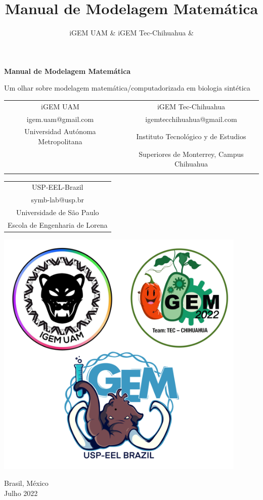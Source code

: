 \documentclass[11pt, letterpaper, portuguese]{article}
\title{Manual de Modelagem Matemática}
\author{iGEM UAM \&  iGEM Tec-Chihuahua \& }
\begin{document}
\begin{titlepage}
   \begin{center}
       \vspace*{1cm}

   {\Huge \textbf{Manual de Modelagem Matemática}}

       \vspace{0.5cm}
        Um olhar sobre modelagem matemática/computadorizada em biologia sintética
            
       \vspace{1.5 cm}

\centering\begin{tabular}{>{\centering\arraybackslash} c c c}
iGEM UAM &  & iGEM Tec-Chihuahua \\
igem.uam@gmail.com &  & igemtecchihuahua@gmail.com\\
Universidad Autónoma Metropolitana &  & Instituto Tecnológico y de Estudios\\
 &  & Superiores de Monterrey, Campus Chihuahua\\
 &  & \\
 \end{tabular}
 \centering\begin{tabular}{>{\centering\arraybackslash} c}
 USP-EEL-Brazil \\
symb-lab@usp.br \\
Universidade de São Paulo \\
Escola de Engenharia de Lorena \\
\end{tabular}



  \vspace{1.0cm}
        
\includegraphics[width=12cm]{Logos-Chih-UAM-USP.png}

       \vfill
       \vspace{0.8cm}
       Brasil, México\\
       Julho 2022
            
   \end{center}
\end{titlepage}
\end{document}
